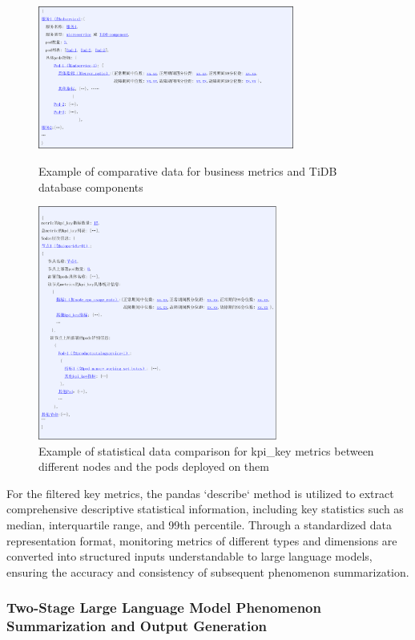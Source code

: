 \documentclass[10pt]{article}
\begin{document}
\begin{figure}[!t]
    \centering
    \includegraphics[width=0.75\textwidth]{pics/fig14.png}
    \caption{Example of comparative data for business metrics and TiDB database components}
    \label{fig14}

    \vspace{10pt}
    \includegraphics[width=0.7\textwidth]{pics/fig15.png}
    \caption{Example of statistical data comparison for kpi\_key metrics between different nodes and the pods deployed on them}
    \label{fig15}
\end{figure}

For the filtered key metrics, the pandas `describe` method is utilized to extract comprehensive descriptive statistical information, including key statistics such as median, interquartile range, and 99th percentile. Through a standardized data representation format, monitoring metrics of different types and dimensions are converted into structured inputs understandable to large language models, ensuring the accuracy and consistency of subsequent phenomenon summarization.

\subsubsection{Two-Stage Large Language Model Phenomenon Summarization and Output Generation}
\end{document}
